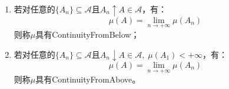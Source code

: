 \begin{definition}
\begin{enumerate}
\begin{equation*}
		\end{equation*}
		则称$\mu$具有\gls{CountablySubadditivity}；
		\item 若对任意的$\{A_n\}\subseteq\mathscr{A}$且$A_n\uparrow A\in\mathscr{A}$，有：
		\begin{equation*}
			\mu\left(A\right)=\lim_{n\to+\infty}\mu(A_n)
		\end{equation*}
		则称$\mu$具有\gls{ContinuityFromBelow}；
		\item 若对任意的$\{A_n\}\subseteq\mathscr{A}$且$A_n\downarrow A\in\mathscr{A},\;\mu(A_1)<+\infty$，有：
		\begin{equation*}
			\mu\left(A\right)=\lim_{n\to+\infty}\mu(A_n)
		\end{equation*}
		则称$\mu$具有\gls{ContinuityFromAbove}。
	\end{enumerate}
\end{definition}
